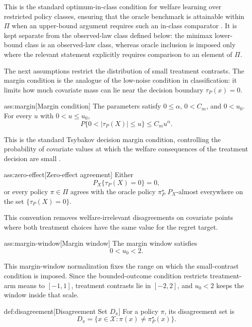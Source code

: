 This is the standard optimum-in-class condition for welfare learning over restricted policy classes, ensuring that the oracle benchmark is attainable within \(\Pi\) when an upper-bound argument requires such an in-class comparator \citep{Kitagawa2018}.  It is kept separate from the observed-law class defined below: the minimax lower-bound class is an observed-law class, whereas oracle inclusion is imposed only where the relevant statement explicitly requires comparison to an element of \(\Pi\).

The next assumptions restrict the distribution of small treatment contrasts.  The margin condition is the analogue of the low-noise condition in classification: it limits how much covariate mass can lie near the decision boundary \(\tau_P(x)=0\).

\begin{assumptionv}{ass:margin}[Margin condition]
The parameters satisfy \(0\le \alpha\), \(0<C_m\), and \(0<u_0\). For every \(u\) with \(0<u\le u_0\),
\[
P\{0<|\tau_P(X)|\le u\}\le C_m u^\alpha .
\]
\end{assumptionv}

This is the standard Tsybakov decision margin condition, controlling the probability of covariate values at which the welfare consequences of the treatment decision are small \citep{Tsybakov2004OptimalAggregation}.

\begin{assumptionv}{ass:zero-effect}[Zero-effect agreement]
Either
\[
P_X\{\tau_P(X)=0\}=0,
\]
or every policy \(\pi\in\Pi\) agrees with the oracle policy \(\pi^\star_P\) \(P_X\)-almost everywhere on the set \(\{\tau_P(X)=0\}\).
\end{assumptionv}

This convention removes welfare-irrelevant disagreements on covariate points where both treatment choices have the same value for the regret target.

\begin{assumptionv}{ass:margin-window}[Margin window]
The margin window satisfies
\[
0<u_0<2.
\]
\end{assumptionv}

This margin-window normalization fixes the range on which the small-contrast condition is imposed.  Since the bounded-outcome condition restricts treatment-arm means to \([-1,1]\), treatment contrasts lie in \([-2,2]\), and \(u_0<2\) keeps the window inside that scale.

\begin{definitionv}{def:disagreement}[Disagreement Set \(D_\pi\)]
For a policy \(\pi\), its disagreement set is
\[
D_\pi=\{x\in\mathcal X:\pi(x)\ne \pi^\star_P(x)\}.
\]
\end{definitionv}


